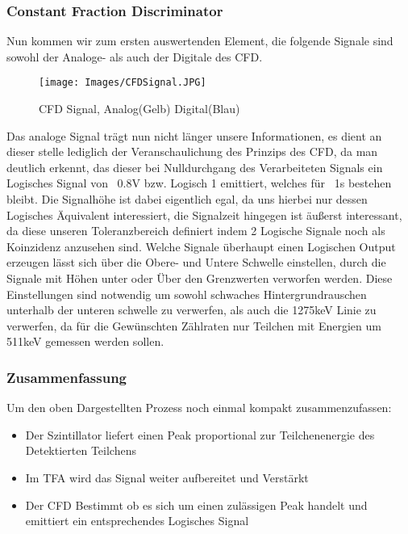 \documentclass{article}
\begin{document}
            \subsubsection{Constant Fraction Discriminator}
                Nun kommen wir zum ersten auswertenden Element, die folgende Signale sind sowohl der Analoge- als auch der Digitale des CFD.
                \begin{figure}[H]
                    \centering
                    \texttt{[image: Images/CFDSignal.JPG]}
                    \caption{CFD Signal, Analog(Gelb) Digital(Blau)}
                \end{figure}
                Das analoge Signal trägt nun nicht länger unsere Informationen, es dient an dieser stelle lediglich der Veranschaulichung des
                Prinzips des CFD, da man deutlich erkennt, das dieser bei Nulldurchgang des Verarbeiteten Signals ein Logisches Signal
                von ~0.8V bzw. Logisch 1 emittiert, welches für ~1s bestehen bleibt. Die Signalhöhe ist dabei eigentlich egal, da uns hierbei nur
                dessen Logisches Äquivalent interessiert, die Signalzeit hingegen ist äußerst interessant, da diese unseren Toleranzbereich definiert
                indem 2 Logische Signale noch als Koinzidenz anzusehen sind. Welche Signale überhaupt einen Logischen Output erzeugen lässt sich über 
                die Obere- und Untere Schwelle einstellen, durch die Signale mit Höhen unter oder Über den Grenzwerten verworfen werden. Diese Einstellungen
                sind notwendig um sowohl schwaches Hintergrundrauschen unterhalb der unteren schwelle zu verwerfen, als auch die 1275keV Linie zu verwerfen,
                da für die Gewünschten Zählraten nur Teilchen mit Energien um 511keV gemessen werden sollen.
            
                \subsubsection{Zusammenfassung}
                Um den oben Dargestellten Prozess noch einmal kompakt zusammenzufassen:
                \begin{itemize}
                    \item Der Szintillator liefert einen Peak proportional zur Teilchenenergie des Detektierten Teilchens
                    \item Im TFA wird das Signal weiter aufbereitet und Verstärkt
                    \item Der CFD Bestimmt ob es sich um einen zulässigen Peak handelt und emittiert ein entsprechendes Logisches Signal
                \end{itemize}
        
\end{document}
